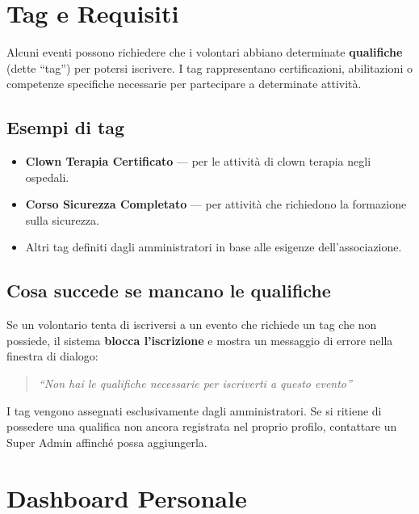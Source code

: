 \documentclass[a4paper,11pt,oneside]{book}
\begin{document}
\section{Tag e Requisiti}
\label{sec:tag-requisiti}

Alcuni eventi possono richiedere che i volontari abbiano determinate \textbf{qualifiche} (dette ``tag'') per potersi iscrivere. I tag rappresentano certificazioni, abilitazioni o competenze specifiche necessarie per partecipare a determinate attivit\`a.

\subsection{Esempi di tag}

\begin{itemize}[leftmargin=1.5em]
  \item \textbf{Clown Terapia Certificato} --- per le attivit\`a di clown terapia negli ospedali.
  \item \textbf{Corso Sicurezza Completato} --- per attivit\`a che richiedono la formazione sulla sicurezza.
  \item Altri tag definiti dagli amministratori in base alle esigenze dell'associazione.
\end{itemize}

\subsection{Cosa succede se mancano le qualifiche}

Se un volontario tenta di iscriversi a un evento che richiede un tag che non possiede, il sistema \textbf{blocca l'iscrizione} e mostra un messaggio di errore nella finestra di dialogo:

\begin{quote}
\textit{``Non hai le qualifiche necessarie per iscriverti a questo evento''}
\end{quote}

\begin{infobox}
I tag vengono assegnati esclusivamente dagli amministratori. Se si ritiene di possedere una qualifica non ancora registrata nel proprio profilo, contattare un Super Admin affinch\'e possa aggiungerla.
\end{infobox}

\section{Dashboard Personale}
\label{sec:dashboard-personale}
\end{document}
